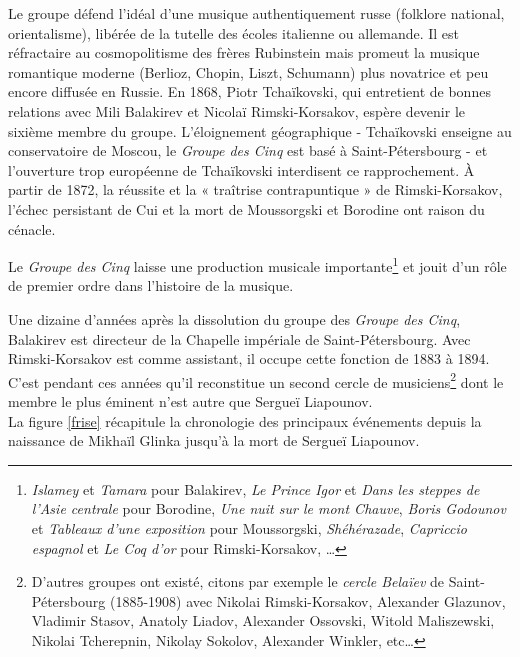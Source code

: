 Le groupe défend l'idéal d'une musique authentiquement russe (folklore national, orientalisme), libérée de la tutelle des écoles italienne ou allemande. Il est réfractaire au cosmopolitisme des frères Rubinstein mais promeut la musique romantique moderne (Berlioz, Chopin, Liszt, Schumann) plus novatrice et peu encore diffusée en Russie. En 1868, Piotr Tchaïkovski, qui entretient de bonnes relations avec Mili Balakirev et Nicolaï Rimski-Korsakov, espère devenir le sixième membre du groupe. L'éloignement géographique - Tchaïkovski enseigne au conservatoire de Moscou, le \emph{Groupe des Cinq} est basé à Saint-Pétersbourg - et l'ouverture trop européenne de Tchaïkovski interdisent ce rapprochement. À partir de 1872, la réussite et la « traîtrise contrapuntique » de Rimski-Korsakov, l'échec persistant de Cui et la mort de Moussorgski et Borodine ont raison du cénacle.

Le \emph{Groupe des Cinq} laisse une production musicale importante\footnote{\emph{Islamey} et \emph{Tamara} pour Balakirev, \emph{Le Prince Igor} et \emph{Dans les steppes de l'Asie centrale} pour Borodine, \emph{Une nuit sur le mont Chauve}, \emph{Boris Godounov} et \emph{Tableaux d'une exposition} pour Moussorgski, \emph{Shéhérazade}, \emph{Capriccio espagnol} et \emph{Le Coq d'or} pour Rimski-Korsakov, \dots} et jouit d'un rôle de premier ordre dans l'histoire de la musique.

Une dizaine d'années après la dissolution du groupe des \emph{Groupe des Cinq}, Balakirev est directeur de la Chapelle impériale de Saint-Pétersbourg. Avec Rimski-Korsakov est comme assistant, il occupe cette fonction de 1883 à 1894. C'est pendant ces années qu'il reconstitue un second cercle de musiciens\footnote{D'autres groupes ont existé, citons par exemple le \emph{cercle Belaïev} de Saint-Pétersbourg (1885-1908) avec Nikolai Rimski-Korsakov, Alexander Glazunov, Vladimir Stasov, Anatoly Liadov, Alexander Ossovski, Witold Maliszewski, Nikolai Tcherepnin, Nikolay Sokolov, Alexander Winkler, etc\dots} dont le membre le plus éminent n'est autre que Sergueï Liapounov.\\

La figure \ref{frise} récapitule la chronologie des principaux événements depuis la naissance de Mikhaïl Glinka jusqu'à la mort de Sergueï Liapounov.

